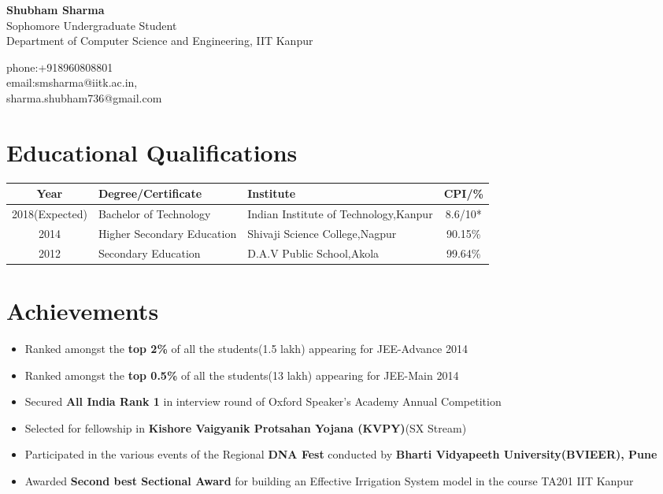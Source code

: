 \documentclass[14pt]{article} %
\begin{document}
\begin{minipage}[ht]{0.70 \textwidth}
{\bfseries \huge  Shubham Sharma}\\Sophomore Undergraduate Student\\Department of Computer Science and Engineering, IIT Kanpur\\
\end{minipage}
\begin{minipage}[ht]{0.20\textwidth}
phone:+918960808801\\email:smsharma@iitk.ac.in,\\sharma.shubham736@gmail.com
\end{minipage}
\vspace{-5pt}
\section*{Educational Qualifications}
\vspace{2pt}
\begin{center}
\begin{tabularx}{\textwidth}{|c|X|X|c|}
 \hline
 \textbf{Year} & \textbf{Degree/Certificate} & \textbf{Institute} & \textbf{CPI/\%} \\
 \hline 
 2018(Expected) & Bachelor of Technology & Indian Institute of Technology,Kanpur & 8.6/10*\\ \hline
 2014 & Higher Secondary Education & Shivaji Science College,Nagpur & 90.15\%\\ \hline
 2012& Secondary Education &D.A.V Public School,Akola  & 99.64\%\\
 \hline
\end{tabularx}
\vspace{-9pt}
\end{center}
\section*{Achievements}
\begin{itemize}
\item Ranked amongst the {\bfseries {top 2\%}} of all the students(1.5 lakh) appearing for JEE-Advance 2014
\vspace{-7pt}
\item Ranked amongst the {\bfseries {top 0.5\%}} of all the students(13 lakh) appearing for JEE-Main 2014
\vspace{-7pt}
\item Secured {\bfseries All India Rank 1} in interview round of Oxford Speaker's Academy Annual Competition
\vspace{-7pt}
\item Selected for fellowship in \textbf{Kishore Vaigyanik Protsahan Yojana (KVPY)}(SX Stream)
\vspace{-7pt}
\item Participated in the various events of the Regional {\bfseries{DNA Fest}} conducted by {\bfseries Bharti Vidyapeeth University(BVIEER), Pune}
\vspace{-20pt}
\item Awarded \textbf{Second best Sectional Award} for building an Effective Irrigation System model in the course TA201 IIT Kanpur
\vspace{-7pt}
\end{itemize}
\end{document}
